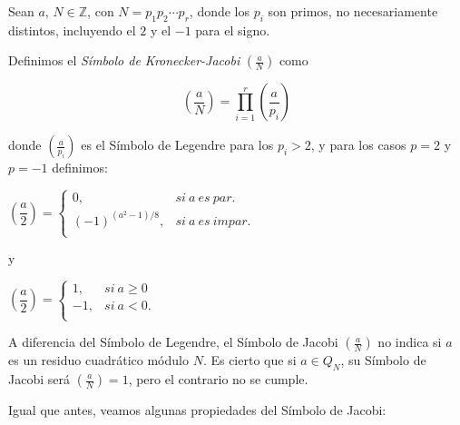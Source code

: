 \begin{definition}
	Sean $a,\,N\in \mathbb{Z}$, con $N = p_1 p_2 \cdots p_r$, donde los $p_i$ son primos, no necesariamente distintos, incluyendo el $2$ y el $-1$ para el signo.
	
	Definimos el \textit{Símbolo de Kronecker-Jacobi} $\left( \frac{a}{N} \right) $ como
	
		\[
		\left( \dfrac{a}{N} \right) = \prod_{i=1}^{r} \left( \dfrac{a}{p_i} \right)
		\]
		
	donde $\left( \frac{a}{p_i} \right)$ es el Símbolo de Legendre para los $p_i > 2$, y para los casos $p=2$ y $p=-1$ definimos:
	
	\begin{center}
		$
		\left( \dfrac{a}{2} \right) = 
			\begin{cases}
			0, & si\ a \ es\ par.\\
			(-1)^{(a^2-1)/8}, & si\ a \ es\ impar.\\
			\end{cases}
		$
	\end{center}

	y
	
	\begin{center}
		$
		\left( \dfrac{a}{2} \right) = 
		\begin{cases}
		1, & si\ a \geq 0\\
		-1, & si\ a < 0.\\
		\end{cases}
		$
	\end{center}
	 
\end{definition}

\begin{remark}
	A diferencia del Símbolo de Legendre, el Símbolo de Jacobi $\left( \frac{a}{N} \right) $ no indica si $a$ es un residuo cuadrático módulo $N$. Es cierto que si $a \in Q_N$, su Símbolo de Jacobi será $\left( \frac{a}{N} \right) = 1$, pero el contrario no se cumple.
\end{remark}

\hfil

Igual que antes, veamos algunas propiedades del Símbolo de Jacobi:


